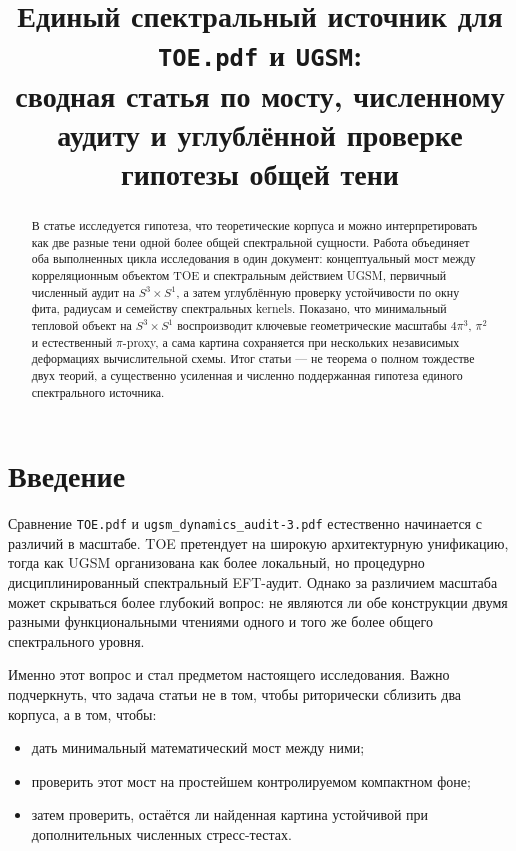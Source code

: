 \documentclass[12pt,a4paper]{article}
\title{Единый спектральный источник для \texttt{TOE.pdf} и \texttt{UGSM}:\\
сводная статья по мосту, численному аудиту и углублённой проверке гипотезы общей тени}
\author{}
\date{}
\begin{document}
\maketitle

\begin{abstract}
В статье исследуется гипотеза, что теоретические корпуса  и  можно интерпретировать как две разные тени одной более общей спектральной сущности. Работа объединяет оба выполненных цикла исследования в один документ: концептуальный мост между корреляционным объектом TOE и спектральным действием UGSM, первичный численный аудит на \(S^3\times S^1\), а затем углублённую проверку устойчивости по окну фита, радиусам и семейству спектральных kernels. Показано, что минимальный тепловой объект на \(S^3\times S^1\) воспроизводит ключевые геометрические масштабы \(4\pi^3\), \(\pi^2\) и естественный \(\pi\)-proxy, а сама картина сохраняется при нескольких независимых деформациях вычислительной схемы. Итог статьи --- не теорема о полном тождестве двух теорий, а существенно усиленная и численно поддержанная гипотеза единого спектрального источника.
\end{abstract}

\section{Введение}

Сравнение \texttt{TOE.pdf} и \texttt{ugsm\_dynamics\_audit-3.pdf} естественно начинается с различий в масштабе. TOE претендует на широкую архитектурную унификацию, тогда как UGSM организована как более локальный, но процедурно дисциплинированный спектральный EFT-аудит. Однако за различием масштаба может скрываться более глубокий вопрос: не являются ли обе конструкции двумя разными функциональными чтениями одного и того же более общего спектрального уровня.

Именно этот вопрос и стал предметом настоящего исследования. Важно подчеркнуть, что задача статьи не в том, чтобы риторически сблизить два корпуса, а в том, чтобы:
\begin{itemize}
    \item дать минимальный математический мост между ними;
    \item проверить этот мост на простейшем контролируемом компактном фоне;
    \item затем проверить, остаётся ли найденная картина устойчивой при дополнительных численных стресс-тестах.
\end{itemize}
\end{document}
